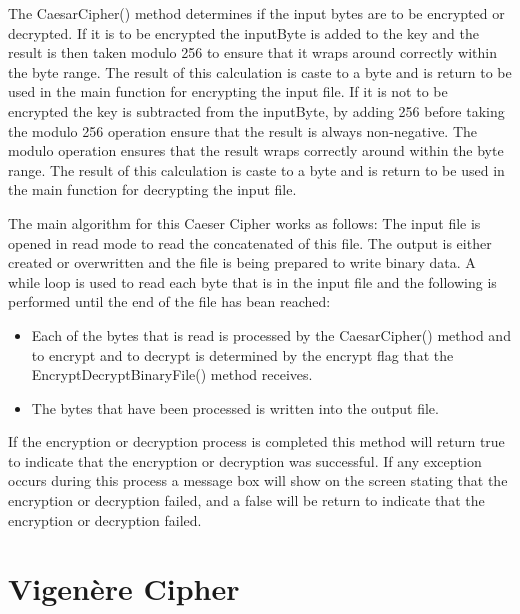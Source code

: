 \documentclass[a4paper,oneside,11pt]{book}
\begin{document}
The CaesarCipher() method determines if the input bytes are to be encrypted or decrypted. If it is to be encrypted the inputByte is added to the key and the result is then taken modulo 256 to ensure that it wraps around correctly within the byte range. The result of this calculation is caste to a byte and is return to be used in the main function for encrypting the input file. If it is not to be encrypted the key is subtracted from the inputByte, by adding 256 before taking the modulo 256 operation ensure that the result is always non-negative. The modulo operation ensures that the result wraps correctly around within the byte range. The result of this calculation is caste to a byte and is return to be used in the main function for decrypting the input file.

The main algorithm for this Caeser Cipher works as follows:
The input file is opened in read mode to read the concatenated of this file. The output is either created or overwritten and the file is being prepared to write binary data. A while loop is used to read each byte that is in the input file and the following is performed until the end of the file has bean reached:
\begin{itemize}
    \item 
        Each of the bytes that is read is processed by the CaesarCipher() method and to encrypt and to decrypt is determined by the encrypt flag that the EncryptDecryptBinaryFile() method receives. 
    \item 
        The bytes that have been processed is written into the output file.
\end{itemize}
If the encryption or decryption process is completed this method will return true to indicate that the encryption or decryption was successful. If any exception occurs during this process a message box will show on the screen stating that the encryption or decryption failed, and a false will be return to indicate that the encryption or decryption failed.

\chapter[Vigenère Cipher]{Vigenère Cipher}
\end{document}
